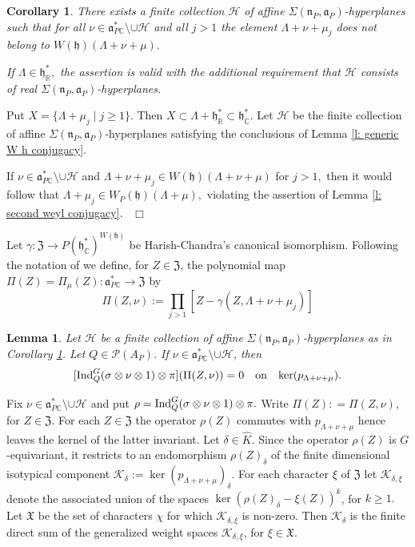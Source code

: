 \documentclass[12pt,a4paper]{article}
\newtheorem{Cor}[Thm]{Corollary}
\newtheorem{Lemma}[Thm]{Lemma}
\newenvironment{cor}[0]{\begin{Cor}\noindent}%
{\end{Cor}}
\newenvironment{lemma}[0]{\begin{Lemma}\noindent}%
{\end{Lemma}}
\def\proof{\par\noindent{\it Proof.}{\ }{\ }}
\def\qed{~\hfill\hbox{$\Box$}\medbreak}
\def\msy#1{{\mathbb #1}}
\def\C{{\msy C}}
\def\R{{\msy R}}
\def\gd{\delta}
\def\gg{\gamma}
\def\gs{\sigma}
\def\gS{\Sigma}
\def\got#1{\mathfrak #1}
\def\fa{{\got a}}
\def\fh{{\got h}}
\def\fn{{\got n}}
\def\to{\rightarrow}
\def\iC{{\scriptscriptstyle \C}}
\def\cH{{\mathcal H}}
\def\cK{{\mathcal K}}
\def\cP{{\mathcal P}}
\numberwithin{Thm}{section}
\numberwithin{equation}{section}
\def\Ind{{\rm Ind}}
\def\fZ{{\mathfrak Z}}
\def\faPdc{{\fa_{P\iC}^*}}
\def\gL{\Lambda}
\def\fhdc{\fh_\iC^*}
\numberwithin{equation}{section}
\def\fZ{{\mathfrak Z}}
\def\gL{\Lambda}
\def\fhdc{\fh_\iC^*}
\def\faPdc{\fa_{P\iC}^*}
\def\fh{{\mathfrak h}}
\def\fX{{\mathfrak X}}
\def\faP{\fa_P}
\def\cchidiff{\xi}
\def\cchi{\chi}
\def\bfhyp{hyperplanes}
\begin{document}
\begin{cor}
\label{c: third Weyl conjugacy}
There exists a finite collection $\cH$ of affine $\gS(\fn_P,\faP)$-{\bfhyp} such that 
for all $\nu \in \faPdc\setminus \cup \cH$ and all $j > 1$ the element $ \gL + \nu +\mu_j$
does not belong to $W(\fh)(\gL + \nu + \mu).$ 

If $\gL \in \fh^*_\R,$  the assertion is 
valid with the additional  requirement that $\cH$ consists of real $\gS(\fn_P, \faP)$-{\bfhyp}.
\end{cor}

\proof 
Put $X = \{\gL+\mu_j\mid j \geq 1\}.$ Then $X \subset \gL + \fh^*_\R \subset \fhdc.$ 
Let $\cH$ be the finite collection of affine $\gS( \fn_P, \fa_P)$-{\bfhyp} 
satisfying the conclusions of Lemma \ref{l: generic W h conjugacy}.

If $\nu \in \faPdc\setminus \cup \cH$ and $\gL + \nu + \mu_j  \in W(\fh)(\gL + \nu + \mu)$
for $j >1,$ then it would follow that $\gL+ \mu_j \in W_P(\fh)(\gL + \mu),$ 
violating the assertion of Lemma  \ref{l: second weyl conjugacy}.
\qed

Let $\gg: \fZ \to P(\fhdc)^{W(\fh)}$ be Harish-Chandra's canonical isomorphism.
Following the notation of \cite{Bps2} we define, for $Z \in \fZ$,  the polynomial map $\Pi(Z) = \Pi_{\mu}(Z): \faPdc \to \fZ$ by 
\begin{equation}
\Pi(Z, \nu):= \prod_{j > 1} [Z   - \gg(Z, \gL + \nu + \mu_j)] 
\end{equation}
\begin{lemma}
\label{l: center zero on ker p}
Let $\cH$ be a finite collection of affine $\gS(\fn_P,\faP)$-{\bfhyp} as in 
Corollary \ref{c: third Weyl conjugacy}.  Let $Q \in \cP(A_P).$ 
If $\nu \in \faPdc\setminus \cup \cH$, then 
\begin{equation}
\label{e: vanishing Pi on ker p}
[\Ind_Q^G(\gs \otimes \nu \otimes 1) \otimes \pi](\Pi(Z, \nu))  = 0  
\quad {\rm on }\;\;\; \ker (p_{\gL + \nu + \mu}).
\end{equation}
\end{lemma}

\proof
Fix $\nu \in \faPdc\setminus \cup \cH$ and put  
$\rho = \Ind_Q^G(\gs \otimes \nu \otimes 1) \otimes \pi.$  Write $\Pi(Z): = \Pi(Z, \nu)$, for $Z \in \fZ.$ 
For each $Z \in \fZ$ the operator $\rho(Z)$ 
commutes with $p_{\gL + \nu + \mu}$ hence leaves the kernel
of the latter invariant. Let $\gd \in \widehat K.$ Since the operator $\rho(Z)$ is $G$-equivariant, 
it restricts to an endomorphism $\rho(Z)_\gd$ of the finite dimensional 
isotypical component $\cK_\gd:= \ker (p_{\gL + \nu + \mu})_\gd.$ For each 
character $\cchidiff$ of $\fZ$ let $\cK_{\gd, \cchidiff}$ denote the associated 
union of the spaces $\ker (\rho(Z)_\gd - \cchidiff(Z))^k$, for $k \geq 1.$ Let $\fX$ be the  set 
of characters $\cchi$ for which $\cK_{\gd, \cchidiff}$ is non-zero. 
Then $\cK_{\gd}$ 
is the finite direct sum of the generalized weight spaces $\cK_{\gd,\cchidiff}$, for $\cchidiff \in \fX.$ 
\end{document}
